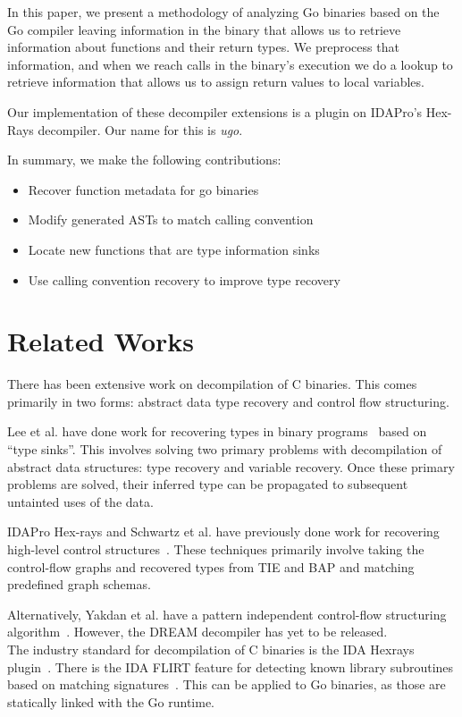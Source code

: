 \documentclass[letterpaper,twocolumn,10pt]{article}
\begin{document}
In this paper, we present a methodology of analyzing Go binaries based on the Go compiler leaving information in the binary that allows us to retrieve information about functions and their return types. We preprocess that information, and when we reach calls in the binary’s execution we do a lookup to retrieve information that allows us to assign return values to local variables.

Our implementation of these decompiler extensions is a plugin on IDAPro’s Hex-Rays decompiler. Our name for this is \textit{ugo}.

In summary, we make the following contributions:
\begin{itemize}
\item Recover function metadata for go binaries
\item Modify generated ASTs to match calling convention
\item Locate new functions that are type information sinks
\item Use calling convention recovery to improve type recovery
\end{itemize}


\section{Related Works}
There has been extensive work on decompilation of C binaries. This comes primarily in two forms: abstract data type recovery and control flow structuring.

Lee et al. have done work for recovering types in binary programs~\cite{tie} based on “type sinks”. This involves solving two primary problems with decompilation of abstract data structures: type recovery and variable recovery. Once these primary problems are solved, their inferred type can be propagated to subsequent untainted uses of the data.

IDAPro Hex-rays and Schwartz et al. have previously done work for recovering high-level control structures~\cite{schwartz}. These techniques primarily involve taking the control-flow graphs and recovered types from TIE and BAP and matching predefined graph schemas.

Alternatively, Yakdan et al. have a pattern independent control-flow structuring algorithm~\cite{dream}. However, the DREAM decompiler has yet to be released.\\
The industry standard for decompilation of C binaries is the IDA Hexrays plugin~\cite{idaprobook}. There is the IDA FLIRT feature for detecting known library subroutines based on matching signatures~\cite{flirt}. This can be applied to Go binaries, as those are statically linked with the Go runtime.
\end{document}
